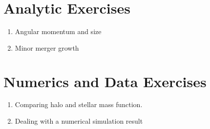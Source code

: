 \section{Analytic Exercises}

\begin{enumerate}
\item Angular momentum and size
\item Minor merger growth
\end{enumerate}

\section{Numerics and Data Exercises}

\begin{enumerate}
\item Comparing halo and stellar mass function.
\item Dealing with a numerical simulation result
\end{enumerate}


  
